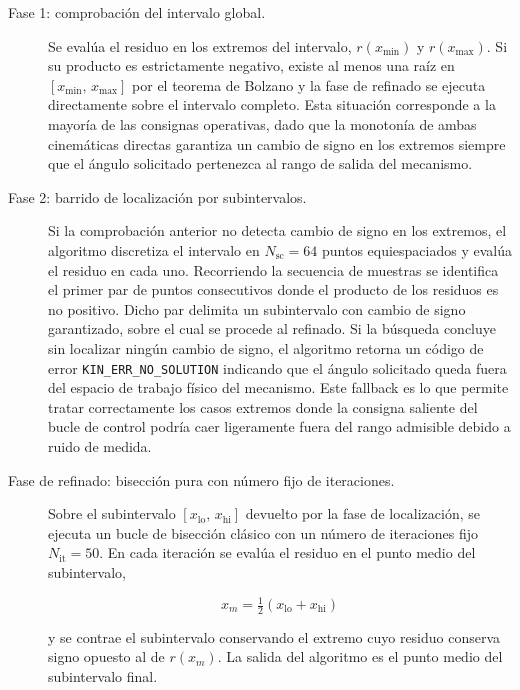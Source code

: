 \begin{description}

\item[Fase 1: comprobación del intervalo global.]
Se evalúa el residuo en los extremos del intervalo, $r(x_{\min})$ y $r(x_{\max})$. Si su producto es estrictamente negativo, existe al menos una raíz en $[x_{\min},\,x_{\max}]$ por el teorema de Bolzano y la fase de refinado se ejecuta directamente sobre el intervalo completo. Esta situación corresponde a la mayoría de las consignas operativas, dado que la monotonía de ambas cinemáticas directas garantiza un cambio de signo en los extremos siempre que el ángulo solicitado pertenezca al rango de salida del mecanismo.

\item[Fase 2: barrido de localización por subintervalos.]
Si la comprobación anterior no detecta cambio de signo en los extremos, el algoritmo discretiza el intervalo en $N_{\text{sc}} = 64$ puntos equiespaciados y evalúa el residuo en cada uno. Recorriendo la secuencia de muestras se identifica el primer par de puntos consecutivos donde el producto de los residuos es no positivo. Dicho par delimita un subintervalo con cambio de signo garantizado, sobre el cual se procede al refinado. Si la búsqueda concluye sin localizar ningún cambio de signo, el algoritmo retorna un código de error \texttt{KIN\_ERR\_NO\_SOLUTION} indicando que el ángulo solicitado queda fuera del espacio de trabajo físico del mecanismo. Este fallback es lo que permite tratar correctamente los casos extremos donde la consigna saliente del bucle de control podría caer ligeramente fuera del rango admisible debido a ruido de medida.

\item[Fase de refinado: bisección pura con número fijo de iteraciones.]
Sobre el subintervalo $[x_{\text{lo}},\,x_{\text{hi}}]$ devuelto por la fase de localización, se ejecuta un bucle de bisección clásico con un número de iteraciones fijo $N_{\text{it}} = 50$. En cada iteración se evalúa el residuo en el punto medio del subintervalo,

\begin{equation}
    x_{m} = \tfrac{1}{2}(x_{\text{lo}} + x_{\text{hi}})
\end{equation}

y se contrae el subintervalo conservando el extremo cuyo residuo conserva signo opuesto al de $r(x_{m})$. La salida del algoritmo es el punto medio del subintervalo final.

\end{description}

